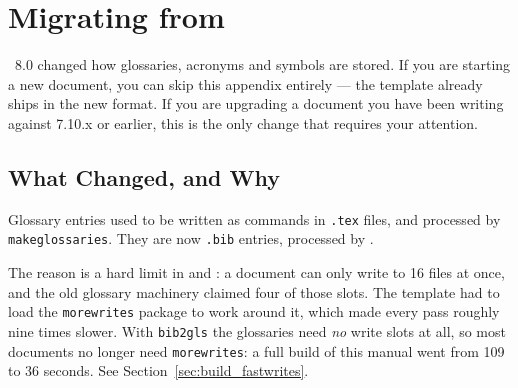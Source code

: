 

%

\chapter{Migrating from }
\label{app:migration}

\novathesis~8.0 changed how glossaries, acronyms and symbols are stored.  If
you are starting a new document, you can skip this appendix entirely --- the
template already ships in the new format.  If you are upgrading a document
you have been writing against 7.10.x or earlier, this is the only change that
requires your attention.

\section{What Changed, and Why}

Glossary entries used to be written as  commands in
\texttt{.tex} files, and processed by \texttt{makeglossaries}.  They are now
\texttt{.bib} entries, processed by .

The reason is a hard limit in  and : a document
can only write to 16 files at once, and the old glossary machinery claimed
four of those slots.  The template had to load the \texttt{morewrites}
package to work around it, which made every  pass roughly
nine times slower.  With \texttt{bib2gls} the glossaries need \emph{no} write
slots at all, so most documents no longer need \texttt{morewrites}:
a full  build of this manual went from 109 to 36 seconds.
See Section~\ref{sec:build_fastwrites}.

